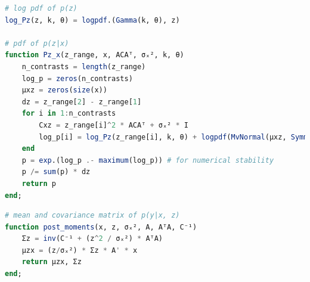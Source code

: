 \begin{lstlisting}[language=julia]
# log pdf of p(z)
log_Pz(z, k, θ) = logpdf.(Gamma(k, θ), z)

# pdf of p(z|x)
function Pz_x(z_range, x, ACAᵀ, σₓ², k, θ)
    n_contrasts = length(z_range)
    log_p = zeros(n_contrasts)
    μxz = zeros(size(x))
    dz = z_range[2] - z_range[1]
    for i in 1:n_contrasts
        Cxz = z_range[i]^2 * ACAᵀ + σₓ² * I
        log_p[i] = log_Pz(z_range[i], k, θ) + logpdf(MvNormal(μxz, Symmetric(Cxz)), x)
    end
    p = exp.(log_p .- maximum(log_p)) # for numerical stability
    p /= sum(p) * dz
    return p
end;
\end{lstlisting}
\begin{lstlisting}[language=julia]
# mean and covariance matrix of p(y|x, z)
function post_moments(x, z, σₓ², A, AᵀA, C⁻¹)
    Σz = inv(C⁻¹ + (z^2 / σₓ²) * AᵀA)
    μzx = (z/σₓ²) * Σz * A' * x
    return μzx, Σz
end;
\end{lstlisting}
